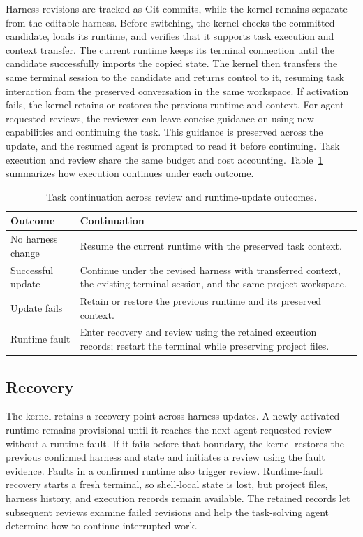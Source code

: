 Harness revisions are tracked as Git commits, while the kernel remains
separate from the editable harness. Before switching, the kernel checks the
committed candidate, loads its runtime, and verifies that it supports task
execution and context transfer. The current runtime keeps its terminal
connection until the candidate successfully imports the copied state.
The kernel then transfers the same terminal session to the candidate and
returns control to it, resuming task interaction from the preserved
conversation in the same workspace. If activation fails, the kernel retains
or restores the previous runtime and context.
For agent-requested reviews, the reviewer can leave concise guidance on using
new capabilities and continuing the task. This guidance is preserved across
the update, and the resumed agent is prompted to read it before continuing.
Task execution and review share the same budget and cost accounting.
Table~\ref{tab:boxbox-continuation} summarizes how execution continues under
each outcome.

\begin{table}[htbp]
  \centering
  \small
  \caption{Task continuation across review and runtime-update outcomes.}
  \label{tab:boxbox-continuation}
  \renewcommand{\arraystretch}{1.15}
  \begin{tabularx}{\linewidth}{@{}>{\raggedright\arraybackslash}p{.26\linewidth}X@{}}
    \toprule
    Outcome & Continuation \\
    \midrule
    No harness change &
    Resume the current runtime with the preserved task context. \\
    Successful update &
    Continue under the revised harness with transferred context, the existing
    terminal session, and the same project workspace. \\
    Update fails &
    Retain or restore the previous runtime and its preserved context. \\
    Runtime fault &
    Enter recovery and review using the retained execution records; restart
    the terminal while preserving project files. \\
    \bottomrule
  \end{tabularx}
\end{table}

\subsection{Recovery}
\label{app:boxbox-validation}

The kernel retains a recovery point across harness updates. A newly activated
runtime remains provisional until it reaches the next agent-requested review
without a runtime fault. If it fails before that boundary, the kernel restores
the previous confirmed harness and state and initiates a review using the
fault evidence. Faults in a confirmed runtime also trigger review.
Runtime-fault recovery starts a fresh terminal, so shell-local state is lost,
but project files, harness history, and execution records remain available.
The retained records let subsequent reviews examine failed revisions and help
the task-solving agent determine how to continue interrupted work.
